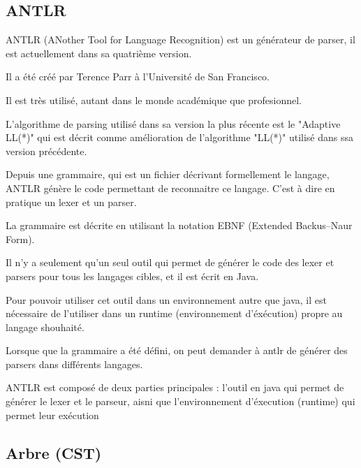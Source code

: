 \documentclass[
    iict, %
    il, %
]{heig-tb}
\begin{document}
\subsection{ANTLR}

ANTLR (ANother Tool for Language Recognition) est un générateur de parser, il est actuellement dans sa quatrième version.

Il a été créé par Terence Parr à l'Université de San Francisco.

Il est très utilisé, autant dans le monde académique que profesionnel.

L'algorithme de parsing utilisé dans sa version la plus récente est le "Adaptive LL(*)" qui est décrit comme amélioration de l'algorithme
"LL(*)" utilisé dans ssa version précédente.


Depuis une grammaire, qui est un fichier décrivant formellement le langage, ANTLR génère le code permettant de reconnaitre ce langage.
C'est à dire en pratique un lexer et un parser. %

La grammaire est décrite en utilisant la notation EBNF (Extended Backus–Naur Form).

Il n'y a seulement qu'un seul outil qui permet de générer le code des lexer et parsers pour tous les langages cibles, et il est écrit en Java.

Pour pouvoir utiliser cet outil dans un environnement autre que java, il est nécessaire de l'utiliser dans un runtime (environnement d'éxécution) propre au langage shouhaité.

Lorsque que la grammaire a été défini, on peut demander à antlr de générer des parsers dans différents langages.

ANTLR est composé de deux parties principales : l'outil en java qui permet de générer le lexer et le parseur, aisni que l'environnement d'éxecution (runtime) qui permet leur exécution


\subsection{Arbre (CST)}
\end{document}
